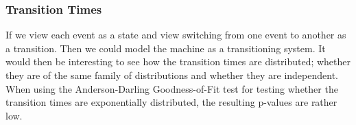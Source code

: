 \subsubsection{Transition Times}
If we view each event as a state and view switching from one event to another as a transition. Then we could model the machine as a transitioning system. It would then be interesting to see how the transition times are distributed; whether they are of the same family of distributions and whether they are independent. \\
When using the Anderson-Darling Goodness-of-Fit test for testing whether the transition times are exponentially distributed, the resulting p-values are rather low. 